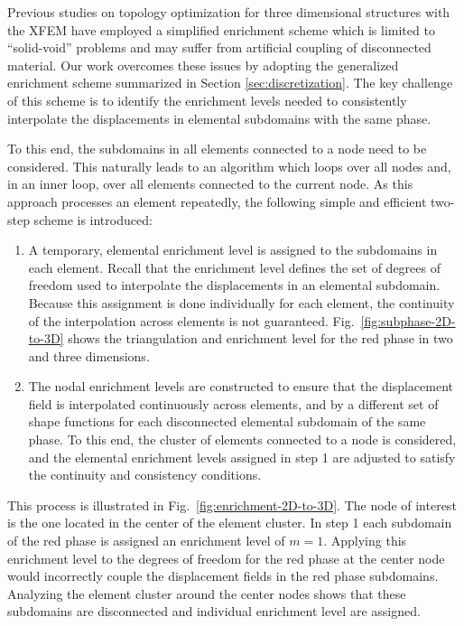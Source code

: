 Previous studies on topology optimization for three dimensional structures with the XFEM \citep{LWW:12} have employed a simplified enrichment scheme which is limited to ``solid-void'' problems and may suffer from artificial coupling of disconnected material. Our work overcomes these issues by adopting the generalized enrichment scheme summarized in Section \ref{sec:discretization}. The key challenge of this scheme is to identify the enrichment levels needed to consistently interpolate the displacements in elemental subdomains with the same phase.

To this end, the subdomains in all elements connected to a node need to be considered. This naturally leads to an algorithm which loops over all nodes and, in an inner loop, over all elements connected to the current node. As this approach processes an element repeatedly, the following simple and efficient two-step scheme is introduced:

\begin{enumerate}

\item A temporary, elemental enrichment level is assigned to the subdomains in each element. Recall that the enrichment	level defines the set of degrees of freedom used to interpolate the displacements in an elemental subdomain. Because this assignment is done individually for each element, the continuity of the interpolation across elements is not guaranteed. Fig.~\ref{fig:subphase-2D-to-3D} shows the triangulation and enrichment level for the red phase in two and three dimensions.

\item The nodal enrichment levels are constructed to ensure that the displacement field is interpolated continuously across elements, and by a different set of shape functions for each disconnected elemental subdomain of the same phase.  To this end, the cluster of elements connected to a node is considered, and the elemental enrichment levels assigned in step 1 are adjusted to satisfy the continuity and consistency conditions.
\end{enumerate}

This process is illustrated in Fig.~\ref{fig:enrichment-2D-to-3D}. The node of interest is the one located in the center of the element cluster. In step 1 each subdomain of the red phase is assigned an enrichment level of $m=1$. Applying this enrichment level to the degrees of freedom for the red phase at the center node would incorrectly couple the displacement fields in the red phase subdomains. Analyzing the element cluster around the center nodes shows that these subdomains are disconnected and individual enrichment level are assigned.

